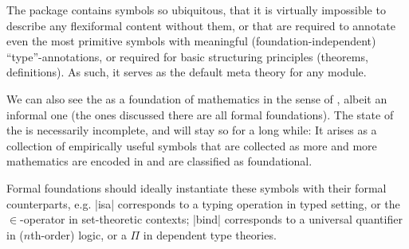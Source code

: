 The  package contains \sTeX symbols so ubiquitous, that it is
virtually impossible to describe any flexiformal content without them, or that are
required to annotate even the most primitive symbols with meaningful
(foundation-independent) ``type''-annotations, or required for basic structuring
principles (theorems, definitions). As such, it serves as the default meta theory for any
\sTeX module.

We can also see the  as a foundation of mathematics in the sense of
\cite{rabe:future:15}, albeit an informal one (the ones discussed there are all formal
foundations). The state of the  is necessarily incomplete, and will
stay so for a long while: It arises as a collection of empirically useful symbols that are
collected as more and more mathematics are encoded in \sTeX and are classified as
foundational.

Formal foundations should ideally instantiate these symbols with their formal counterparts,
e.g. |isa| corresponds to a typing operation in typed setting, or the $\in$-operator in
set-theoretic contexts; |bind| corresponds to a universal quantifier in ($n$th-order)
logic, or a $\Pi$ in dependent type theories.



